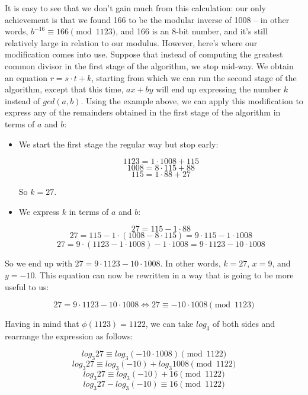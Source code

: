 \documentclass{article}
\begin{document}
        It is easy to see that we don't gain much from this calculation: our only achievement is that we found 166 to be the modular inverse of 1008 -- in other words, $b^{-16} \equiv 166 \pmod{1123}$, and 166 is an 8-bit number, and it's still relatively large in relation to our modulus. However, here's where our modification comes into use. Suppose that instead of computing the greatest common divisor in the first stage of the algorithm, we stop mid-way. We obtain an equation $r = s \cdot t + k$, starting from which we can run the second stage of the algorithm, except that this time, $ax + by$ will end up expressing the number $k$ instead of $gcd(a,b)$. Using the example above, we can apply this modification to express any of the remainders obtained in the first stage of the algorithm in terms of $a$ and $b$:
        \begin{itemize}

          \item We start the first stage the regular way but stop early:

            $$1123 = 1 \cdot 1008 + 115$$
            $$1008 = 8 \cdot 115 + 88$$
            $$115 = 1 \cdot 88 + 27$$

            So $k = 27$.

          \item We express $k$ in terms of $a$ and $b$:

            $$27 = 115 - 1 \cdot 88$$
            $$27 = 115 - 1 \cdot (1008 - 8 \cdot 115) = 9 \cdot 115 - 1 \cdot 1008$$
            $$27 = 9 \cdot (1123 - 1 \cdot 1008) - 1 \cdot 1008 = 9 \cdot 1123 - 10 \cdot 1008$$

        \end{itemize}

        So we end up with $27 = 9 \cdot 1123 - 10 \cdot 1008$. In other words, $k = 27$, $x = 9$, and $y = -10$. This equation can now be rewritten in a way that is going to be more useful to us:

        $$27 = 9 \cdot 1123 - 10 \cdot 1008 \iff 27 \equiv -10 \cdot 1008 \pmod{1123}$$

        Having in mind that $\phi(1123) = 1122$, we can take $log_3$ of both sides and rearrange the expression as follows:

        $$log_3 27 \equiv log_3 (-10 \cdot 1008) \pmod{1122}$$
        $$log_3 27 \equiv log_3 (-10) + log_3 1008 \pmod{1122}$$
        $$log_3 27 \equiv log_3 (-10) + 16 \pmod{1122}$$
        $$log_3 27 - log_3 (-10) \equiv 16 \pmod{1122}$$
\end{document}

